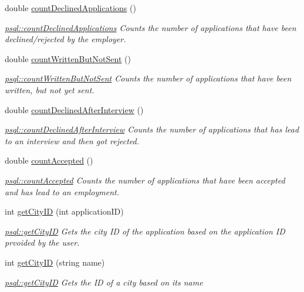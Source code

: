 \begin{DoxyCompactItemize}
double \hyperlink{classpsql_a40541367c3af9c0ac94e2fb92f00f53c}{count\+Declined\+Applications} ()
\begin{DoxyCompactList}\small\item\em \hyperlink{classpsql_a40541367c3af9c0ac94e2fb92f00f53c}{psql\+::count\+Declined\+Applications} Counts the number of applications that have been declined/rejected by the employer. \end{DoxyCompactList}\item 
double \hyperlink{classpsql_a70ad9f4b00735a55232f46da4edd2edc}{count\+Written\+But\+Not\+Sent} ()
\begin{DoxyCompactList}\small\item\em \hyperlink{classpsql_a70ad9f4b00735a55232f46da4edd2edc}{psql\+::count\+Written\+But\+Not\+Sent} Counts the number of applications that have been written, but not yet sent. \end{DoxyCompactList}\item 
double \hyperlink{classpsql_a2ae512bc231446d5fccae84582395675}{count\+Declined\+After\+Interview} ()
\begin{DoxyCompactList}\small\item\em \hyperlink{classpsql_a2ae512bc231446d5fccae84582395675}{psql\+::count\+Declined\+After\+Interview} Counts the number of applications that has lead to an interview and then got rejected. \end{DoxyCompactList}\item 
double \hyperlink{classpsql_a0beec2f098edc0961f27774cdd54d09b}{count\+Accepted} ()
\begin{DoxyCompactList}\small\item\em \hyperlink{classpsql_a0beec2f098edc0961f27774cdd54d09b}{psql\+::count\+Accepted} Counts the number of applications that have been accepted and has lead to an employment. \end{DoxyCompactList}\item 
int \hyperlink{classpsql_af3462a12dc106e0ca8df4fa8fcf28436}{get\+City\+ID} (int application\+ID)
\begin{DoxyCompactList}\small\item\em \hyperlink{classpsql_af3462a12dc106e0ca8df4fa8fcf28436}{psql\+::get\+City\+ID} Gets the city ID of the application based on the application ID prvoided by the user. \end{DoxyCompactList}\item 
int \hyperlink{classpsql_a0c33b3f48064ba75abaa4b0b58eb1ccd}{get\+City\+ID} (string name)
\begin{DoxyCompactList}\small\item\em \hyperlink{classpsql_af3462a12dc106e0ca8df4fa8fcf28436}{psql\+::get\+City\+ID} Gets the ID of a city based on its name \end{DoxyCompactList}\item 

\end{DoxyCompactItemize}
